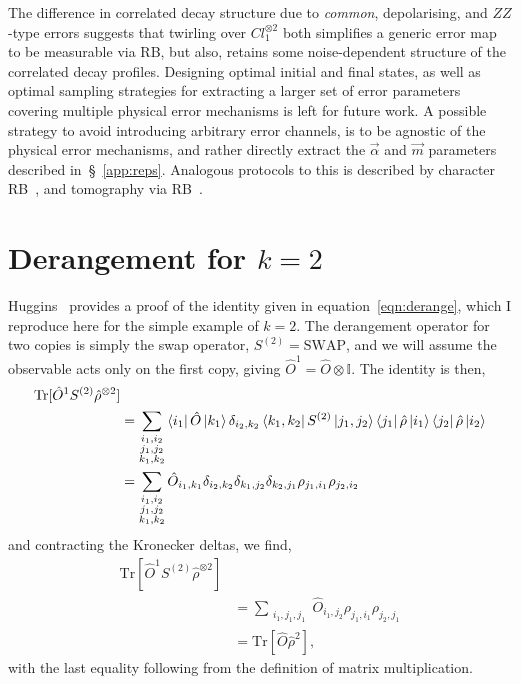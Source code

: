 The difference in correlated decay structure due to \emph{common}, depolarising, and $ZZ$-type errors suggests that twirling over $Cl_1^{\otimes2}$ both simplifies a generic error map to be measurable via RB, but also, retains some noise-dependent structure of the correlated decay profiles.  
Designing optimal initial and final states, as well as optimal sampling strategies for extracting a larger set of error parameters covering multiple physical error mechanisms is left for future work. A possible strategy to avoid introducing arbitrary error channels, is to be agnostic of the physical error mechanisms, and rather directly extract the $\vec\alpha$ and $\vec m$ parameters described in~\S~\ref{app:reps}. Analogous protocols to this is described by character RB~\cite{helsen_new_2019}, and tomography via RB~\cite{kimmel_robust_2014}.


\section{Derangement for $k=2$}
\label{app:derange}
Huggins~\cite{huggins_virtual_2021} provides a proof of the identity given
in equation~\ref{eqn:derange}, which I reproduce here for the simple example
of $k=2$.   The derangement operator for two copies is simply the swap
operator, $S^{(2)}=\mathrm{SWAP}$, and we will assume the observable acts
only on the first copy, giving $\hat{O}^1 = \hat{O}\otimes\mathbb{I}$. The
identity is then,
    \begin{subequations}
\begin{align}
    \mathrm{Tr}[\hat{O}^1S^{(2)}\hat\rho^{\otimes 2}]&\\
    &= \sum_{\substack{i_1,i_2\\j_1,j_2\\k_1,k_2}} \bra{i_1}\hat{O}\ket{k_1}\delta_{i_2,k_2}
    \bra{k_1, k_2}S^{(2)}\ket{j_1,j_2}\bra{j_1}\hat\rho\ket{i_1}\bra{j_2}\hat\rho\ket{i_2}\\
    &= \sum_{\substack{i_1,i_2\\j_1,j_2\\k_1, k_2}} \hat{O}_{i_1, k_1}\delta_{i_2,k_2}\delta_{k_1,j_2}\delta_{k_2,j_1}\rho_{j_1,i_1}\rho_{j_2,i_2}
\end{align}
\end{subequations}
and contracting the Kronecker deltas, we find,
    \begin{subequations}
\begin{align}
    \mathrm{Tr}[\hat{O}^1S^{(2)}\hat\rho^{\otimes 2}]&\\
    &= \sum_{\substack{i_1,j_1, j_1}} \hat{O}_{i_1, j_2}\rho_{j_1,i_1}\rho_{j_2,j_1}\\
    &= \mathrm{Tr}[\hat{O}\hat\rho^2],
\end{align}
\end{subequations}
with the last equality following from the definition of matrix multiplication. 
